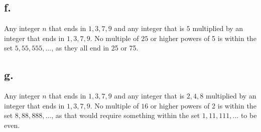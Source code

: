 \documentclass{article}
\begin{document}
\subsection*{f.}
Any integer $n$ that ends in $1, 3, 7, 9$ and any integer that is $5$ multiplied by an integer that ends in $1, 3, 7, 9$. No multiple of $25$ or higher powers of 5 is within the set ${5, 55, 555, ...}$, as they all end in 25 or 75.
\subsection*{g.}
Any integer $n$ that ends in $1, 3, 7, 9$ and any integer that is $2, 4, 8$ multiplied by an integer that ends in $1, 3, 7, 9$. No multiple of $16$ or higher powers of 2 is within the set ${8, 88, 888, ...}$, as that would require something within the set ${1, 11, 111, ...}$ to be even.
\pagebreak
\end{document}
